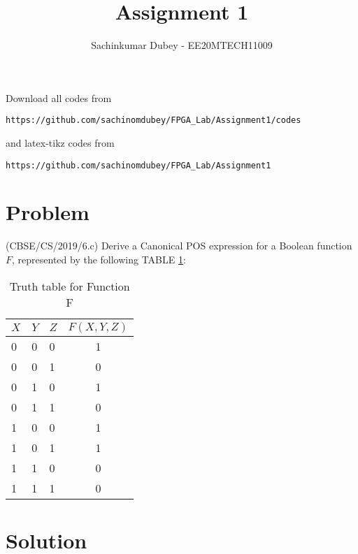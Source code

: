 \documentclass[journal,12pt,twocolumn]{IEEEtran}
\begin{document}
\def\putbox#1#2#3{\makebox[0in][l]{\makebox[#1][l]{}\raisebox{\baselineskip}[0in][0in]{\raisebox{#2}[0in][0in]{#3}}}}
     \def\rightbox#1{\makebox[0in][r]{#1}}
     \def\centbox#1{\makebox[0in]{#1}}
     \def\topbox#1{\raisebox{-\baselineskip}[0in][0in]{#1}}
     \def\midbox#1{\raisebox{-0.5\baselineskip}[0in][0in]{#1}}
\vspace{3cm}
\title{Assignment 1}
\author{Sachinkumar Dubey - EE20MTECH11009}
\maketitle
\newpage
\bigskip
\renewcommand{\thefigure}{\theenumi}
\renewcommand{\thetable}{\theenumi}
\noindent Download all codes from 
\begin{lstlisting}
https://github.com/sachinomdubey/FPGA_Lab/Assignment1/codes
\end{lstlisting}
%
and latex-tikz codes from 
%
\begin{lstlisting}
https://github.com/sachinomdubey/FPGA_Lab/Assignment1
\end{lstlisting}
\section{Problem}
\noindent(CBSE/CS/2019/6.c) Derive a Canonical POS expression for a Boolean function $F$, represented by the following TABLE \ref{TTF}:
\begin{table}[h!]
\centering
\begin{tabular}{|l|l|l|c|} 
\hline
$X$ & $Y$ & $Z$ & $F(X,Y,Z)$  \\ 
\hline
0 & 0 & 0 & 1         \\ 
\hline
0 & 0 & 1 & 0         \\ 
\hline
0 & 1 & 0 & 1         \\ 
\hline
0 & 1 & 1 & 0         \\ 
\hline
1 & 0 & 0 & 1         \\ 
\hline
1 & 0 & 1 & 1         \\ 
\hline
1 & 1 & 0 & 0         \\ 
\hline
1 & 1 & 1 & 0         \\
\hline
\end{tabular}
\caption{Truth table for Function F}
\label{TTF}
\vspace{-8mm}
\end{table}
\section{Solution}
\end{document}
